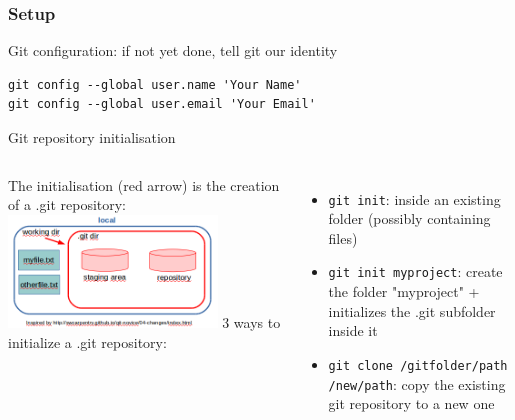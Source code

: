 \begin{frame}[containsverbatim]
\frametitle{ Setup}
\begin{block}{Git configuration: if not yet done, tell git our identity}
\begin{lstlisting}
git config --global user.name 'Your Name'
git config --global user.email 'Your Email'
\end{lstlisting}
\end{block}
\begin{block}{Git repository initialisation}
\begin{columns}
   The initialisation (red arrow) is the creation of a .git repository:
   \includegraphics[height=3cm]{05_history/Images/FAIR_git_init.png}
   3 ways to initialize a .git repository:
   \begin{itemize}
       \item \verb|git init|: inside an existing folder (possibly containing files)
       \item \verb|git init myproject|: create the folder "myproject" + initializes the .git subfolder inside it
       \item \verb|git clone /gitfolder/path /new/path|: copy the existing git repository to a new one
    \end{itemize}
\end{columns}
\end{block}
\end{frame}
